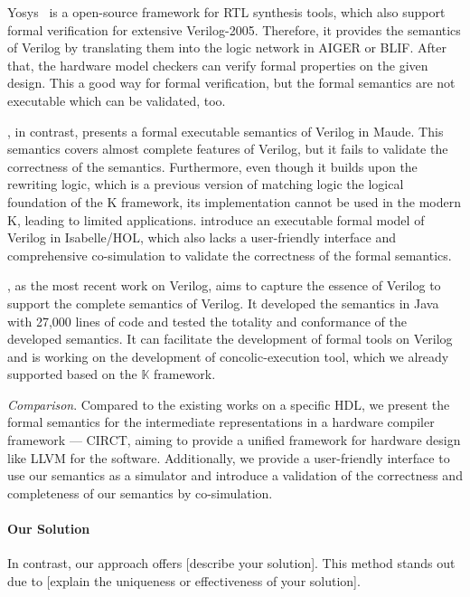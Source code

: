  Yosys~\cite{wolfYosysaFreeVerilog2013} is a open-source framework for RTL synthesis tools, which also support formal verification for extensive Verilog-2005. Therefore, it provides the semantics of Verilog by translating them into the logic network in AIGER or BLIF. After that, the hardware model checkers can verify formal properties on the given design. This a good way for formal verification, but the formal semantics are not executable which can be validated, too.  

 \citet{meredithFormalExecutableSemantics2010}, in contrast, presents a formal executable semantics of Verilog in Maude. This semantics covers almost complete features of Verilog, but it fails to validate the correctness of the semantics. Furthermore, even though it builds upon the rewriting logic, which is a previous version of matching logic the logical foundation of the K framework, its implementation cannot be used in the modern K, leading to limited applications. \citet{khanVeriFormalExecutableFormal2017} introduce an executable formal model of Verilog in Isabelle/HOL, which also lacks a user-friendly interface and comprehensive co-simulation to validate the correctness of the formal semantics. 

 \citet{chenEssenceVerilogTractable2023}, as the most recent work on Verilog, aims to capture the essence of Verilog to support the complete semantics of Verilog. It developed the semantics in Java with 27,000 lines of code and tested the totality and conformance of the developed semantics. It can facilitate the development of formal tools on Verilog and is working on the development of concolic-execution tool, which we already supported based on the $\mathbb{K}$ framework.

 \textit{Comparison}. Compared to the existing works on a specific HDL, we present the formal semantics for the intermediate representations in a hardware compiler framework --- CIRCT, aiming to provide a unified framework for hardware design like LLVM for the software. Additionally, we provide a user-friendly interface to use our semantics as a simulator and introduce a validation of the correctness and completeness of our semantics by co-simulation.

\paragraph{Our Solution}
\ToWrite{}
In contrast, our approach offers [describe your solution]. This method stands out due to [explain the uniqueness or effectiveness of your solution].

